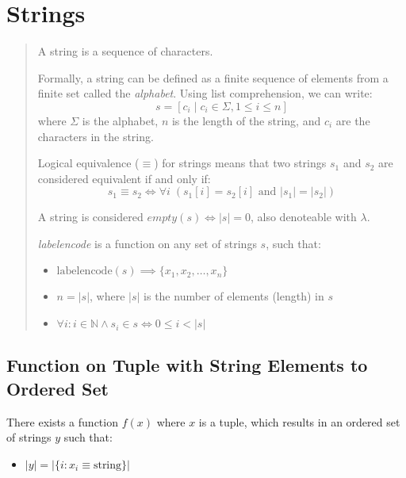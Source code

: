 \section{Strings}

\begin{quote}
A string is a sequence of characters.

Formally, a string can be defined as a finite sequence of elements from a finite set called the \emph{alphabet}. Using list comprehension, we can write:
\[
s = [c_i \mid c_i \in \Sigma, 1 \leq i \leq n]
\]
where $\Sigma$ is the alphabet, $n$ is the length of the string, and $c_i$ are the characters in the string.

Logical equivalence ($\equiv$) for strings means that two strings $s_1$ and $s_2$ are considered equivalent if and only if:
\[
s_1 \equiv s_2 \iff \forall i \; (s_1[i] = s_2[i] \text{ and } |s_1| = |s_2|)
\]

A string is considered $empty(s) \iff |s| = 0$, also denoteable with $\lambda$.

\emph{labelencode} is a function on any set of strings $s$, such that:
\begin{itemize}
    \item $\text{labelencode}(s) \implies \{ x_1, x_2, \ldots, x_n \}$
    \item $n = |s|$, where $|s|$ is the number of elements (length) in $s$
    \item $\forall i : i \in \mathbb{N} \land s_i \in s \iff 0 \le i < |s|$
\end{itemize}
\end{quote}

\subsection{Function on Tuple with String Elements to Ordered Set}

There exists a function $f(x)$ where $x$ is a tuple, which results in an ordered set of strings $y$ such that:
\begin{itemize}
    \item $|y| = |\{ i : x_i \equiv \text{string} \}|$
\end{itemize}
